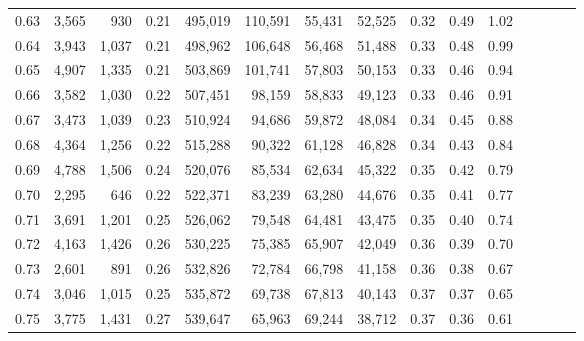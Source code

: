 \begin{tabular}{rrrcrrrrrrrrrrr}
0.63 &   3,565 &     930 &                                       0.21 &  495,019 &  110,591 &   55,431 &   52,525 &  0.32 &  0.49 &                         1.02 \\
0.64 &   3,943 &   1,037 &                                       0.21 &  498,962 &  106,648 &   56,468 &   51,488 &  0.33 &  0.48 &                         0.99 \\
0.65 &   4,907 &   1,335 &                                       0.21 &  503,869 &  101,741 &   57,803 &   50,153 &  0.33 &  0.46 &                         0.94 \\
0.66 &   3,582 &   1,030 &                                       0.22 &  507,451 &   98,159 &   58,833 &   49,123 &  0.33 &  0.46 &                         0.91 \\
0.67 &   3,473 &   1,039 &                                       0.23 &  510,924 &   94,686 &   59,872 &   48,084 &  0.34 &  0.45 &                         0.88 \\
0.68 &   4,364 &   1,256 &                                       0.22 &  515,288 &   90,322 &   61,128 &   46,828 &  0.34 &  0.43 &                         0.84 \\
0.69 &   4,788 &   1,506 &                                       0.24 &  520,076 &   85,534 &   62,634 &   45,322 &  0.35 &  0.42 &                         0.79 \\
0.70 &   2,295 &     646 &                                       0.22 &  522,371 &   83,239 &   63,280 &   44,676 &  0.35 &  0.41 &                         0.77 \\
0.71 &   3,691 &   1,201 &                                       0.25 &  526,062 &   79,548 &   64,481 &   43,475 &  0.35 &  0.40 &                         0.74 \\
0.72 &   4,163 &   1,426 &                                       0.26 &  530,225 &   75,385 &   65,907 &   42,049 &  0.36 &  0.39 &                         0.70 \\
0.73 &   2,601 &     891 &                                       0.26 &  532,826 &   72,784 &   66,798 &   41,158 &  0.36 &  0.38 &                         0.67 \\
0.74 &   3,046 &   1,015 &                                       0.25 &  535,872 &   69,738 &   67,813 &   40,143 &  0.37 &  0.37 &                         0.65 \\
0.75 &   3,775 &   1,431 &                                       0.27 &  539,647 &   65,963 &   69,244 &   38,712 &  0.37 &  0.36 &                         0.61 \\

\end{tabular}
